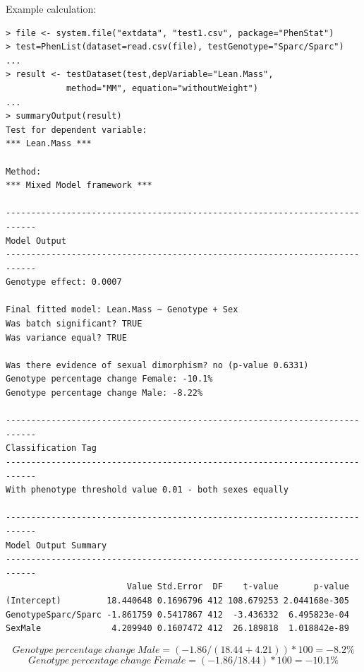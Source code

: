 \documentclass[12pt,a4paper]{article}
\begin{document}
Example calculation:
\begingroup
\fontsize{8pt}{12pt}\selectfont
\begin{verbatim}
> file <- system.file("extdata", "test1.csv", package="PhenStat")
> test=PhenList(dataset=read.csv(file), testGenotype="Sparc/Sparc")
...
> result <- testDataset(test,depVariable="Lean.Mass", 
			method="MM", equation="withoutWeight")
...			
> summaryOutput(result)
Test for dependent variable:
*** Lean.Mass ***

Method:
*** Mixed Model framework ***

----------------------------------------------------------------------------
Model Output
----------------------------------------------------------------------------
Genotype effect: 0.0007

Final fitted model: Lean.Mass ~ Genotype + Sex
Was batch significant? TRUE
Was variance equal? TRUE

Was there evidence of sexual dimorphism? no (p-value 0.6331)
Genotype percentage change Female: -10.1%
Genotype percentage change Male: -8.22%

----------------------------------------------------------------------------
Classification Tag
----------------------------------------------------------------------------
With phenotype threshold value 0.01 - both sexes equally

----------------------------------------------------------------------------
Model Output Summary
----------------------------------------------------------------------------
                        Value Std.Error  DF    t-value       p-value
(Intercept)         18.440648 0.1696796 412 108.679253 2.044168e-305
GenotypeSparc/Sparc -1.861759 0.5417867 412  -3.436332  6.495823e-04
SexMale              4.209940 0.1607472 412  26.189818  1.018842e-89
\end{verbatim}
\endgroup 
\[
Genotype\:percentage\:change\:Male = (-1.86/(18.44+4.21))*100=-8.2\%
\]
\[
Genotype\:percentage\:change\:Female = (-1.86/18.44)*100=-10.1\%
\]
\end{document}
